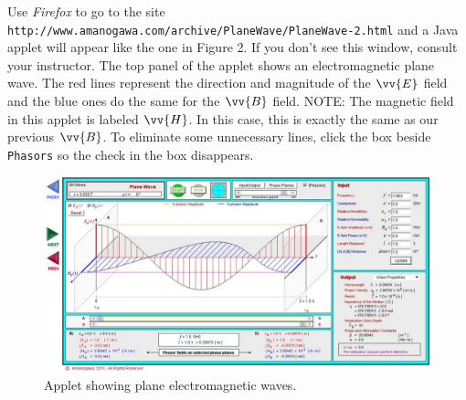 Use \textit{Firefox} to go to the site
\verb!http://www.amanogawa.com/archive/PlaneWave/PlaneWave-2.html! and a Java applet will appear 
like the one in Figure 2. 
If you don't see this window, consult your instructor.
The top panel of the applet shows an electromagnetic plane wave.
The red lines represent the direction and magnitude of the $\vv {E}$ field and the
blue ones do the same for the $\vv {B}$ field.
NOTE: The magnetic field in this applet is labeled $\vv {H}$.
In this case, this is exactly the same as our previous $\vv {B}$.
To eliminate some unnecessary lines, click the box beside \texttt{Phasors} so the check in the box 
disappears.
\begin{figure}[hbt]
\begin{center}
\includegraphics[width=5.0in]{plane_waves/plane_wave_screenshot.pdf}
\caption{Applet showing plane electromagnetic waves.}
\end{center}
\end{figure}
\vspace{-0.3in}

\pagebreak[2]

